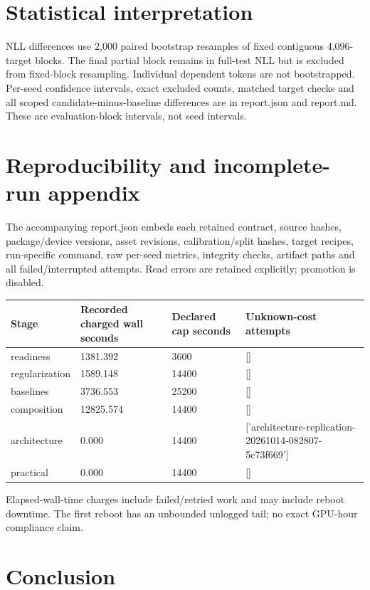\documentclass[10pt]{article}
\begin{document}
\section{Statistical interpretation}

NLL differences use 2,000 paired bootstrap resamples of fixed contiguous 4,096-target blocks. The final partial block remains in full-test NLL but is excluded from fixed-block resampling. Individual dependent tokens are not bootstrapped. Per-seed confidence intervals, exact excluded counts, matched target checks and all scoped candidate-minus-baseline differences are in report.json and report.md. These are evaluation-block intervals, not seed intervals.

\section{Reproducibility and incomplete-run appendix}

The accompanying report.json embeds each retained contract, source hashes, package/device versions, asset revisions, calibration/split hashes, target recipes, run-specific command, raw per-seed metrics, integrity checks, artifact paths and all failed/interrupted attempts. Read errors are retained explicitly; promotion is disabled.

{\scriptsize\setlength{\tabcolsep}{2pt}
\begin{longtable}{p{}p{}p{}p{}}
Stage & Recorded charged wall seconds & Declared cap seconds & Unknown-cost attempts \\
\hline\endhead
readiness & 1381.392 & 3600 & [] \\
regularization & 1589.148 & 14400 & [] \\
baselines & 3736.553 & 25200 & [] \\
composition & 12825.574 & 14400 & [] \\
architecture & 0.000 & 14400 & ['architecture-replication-20261014-082807-5c73f669'] \\
practical & 0.000 & 14400 & [] \\
\end{longtable}}

Elapsed-wall-time charges include failed/retried work and may include reboot downtime. The first reboot has an unbounded unlogged tail; no exact GPU-hour compliance claim.

\section{Conclusion}
\end{document}
